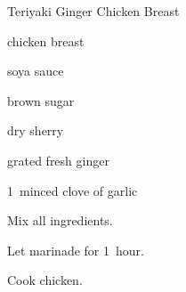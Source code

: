 \begin{recipe}{Teriyaki Ginger Chicken Breast}{}{}

\begin{ingredients}
\item {} chicken breast
\item {} soya sauce
\item {} brown sugar
\item {} dry sherry
\item \tp{\half} grated fresh ginger
\item 1~minced clove of garlic
\end{ingredients}

\begin{directions}
\item Mix all ingredients.
\item Let marinade for 1~hour.
\item Cook chicken.
\end{directions}

\end{recipe}

